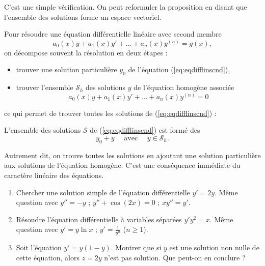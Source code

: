 \documentclass[class=report,crop=false]{standalone}
\begin{document}
C'est une simple vérification. On peut reformuler la proposition en disant que l'ensemble des solutions
forme un espace vectoriel.


\bigskip

Pour résoudre une équation différentielle linéaire avec second membre
\begin{equation}
  a_0(x)y+a_1(x)y'+\dots +a_n(x)y^{(n)} = g(x),
  \label{eq:eqdifflinscnd}
 \tag{$E$}
\end{equation}
on décompose souvent la résolution en deux étapes :
\begin{itemize}
  \item trouver une solution particulière $y_0$ de l'équation (\ref{eq:eqdifflinscnd}),
  \item trouver l'ensemble $\mathcal{S}_h$ des solutions $y$ de l'équation homogène associée
\begin{equation}
  a_0(x)y+a_1(x)y'+\dots +a_n(x)y^{(n)} = 0
  \label{eq:eqdifflinbis}
 \tag{$E_0$}
\end{equation}
\end{itemize}
ce qui permet de trouver toutes les solutions de (\ref{eq:eqdifflinscnd}) :
\begin{proposition}
L'ensemble des solutions $\mathcal{S}$ de (\ref{eq:eqdifflinscnd}) est formé
des
$$y_0 + y \quad \text{ avec } \quad  y \in \mathcal{S}_h.$$
\end{proposition}
Autrement dit, on trouve toutes les solutions en ajoutant une solution particulière
aux solutions de l'équation homogène.
C'est une conséquence immédiate du caractère linéaire des équations.

\begin{miniexercices}
\sauteligne
\begin{enumerate}
  \item Chercher une solution \og simple \fg{} de l'équation différentielle
  $y'=2y$. Même question avec $y''=-y$ ; $y''+\cos(2x)=0$ ; $xy''=y'$.

  \item Résoudre l'équation différentielle à variables séparées $y'y^2=x$.
  Même question avec $y'= y \ln x$ ; $y' = \frac{1}{y^n}$ ($n\ge1$).

  \item Soit l'équation $y' = y(1 - y)$. Montrer que si
  $y$ est une solution non nulle de cette équation, alors $z = 2y$
  n'est pas solution. Que peut-on en conclure ?

\end{enumerate}
\end{miniexercices}
\end{document}
